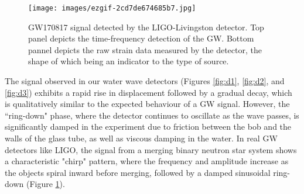 \begin{figure}[h!]
    \centering
    \texttt{[image: images/ezgif-2cd7de674685b7.jpg]}
    \caption{GW170817 signal detected by the LIGO-Livingston detector. Top panel depicts the time-frequency detection of the GW. Bottom pannel depicts the raw strain data measured by the detector, the shape of which being an indicator to the type of source. \cite{Abbott_2017}}
    \label{fig:NS-GW}
\end{figure}


The signal observed in our water wave detectors (Figures \ref{fig:d1}, \ref{fig:d2}, and \ref{fig:d3}) exhibits a rapid rise in displacement followed by a gradual decay, which is qualitatively similar to the expected behaviour of a GW signal. However, the ``ring-down" phase, where the detector continues to oscillate as the wave passes, is significantly damped in the experiment due to friction between the bob and the walls of the glass tube, as well as viscous damping in the water. In real GW detectors like LIGO, the signal from a merging binary neutron star system shows a characteristic "chirp" pattern, where the frequency and amplitude increase as the objects spiral inward before merging, followed by a damped sinusoidal ring-down (Figure \ref{fig:NS-GW}).



